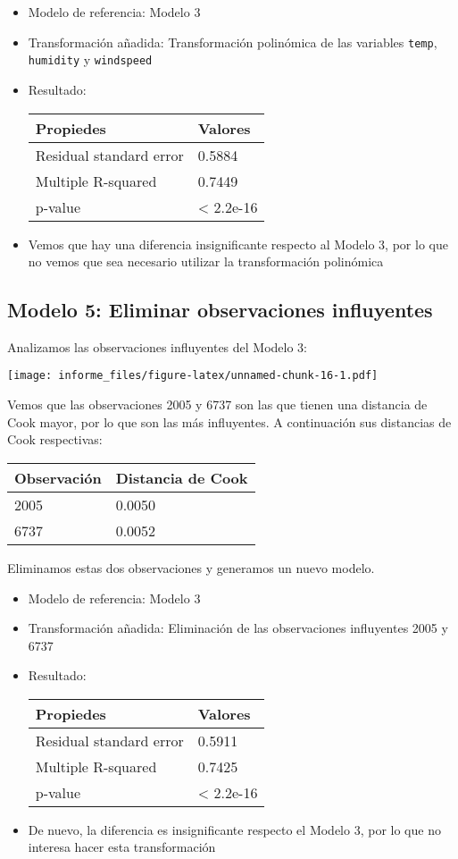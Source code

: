 \documentclass[
]{article}
\begin{document}
\begin{itemize}
\item
  Modelo de referencia: Modelo 3
\item
  Transformación añadida: Transformación polinómica de las variables
  \texttt{temp}, \texttt{humidity} y \texttt{windspeed}
\item
  Resultado:

  \begin{longtable}[]{@{}ll@{}}
  \toprule
  Propiedes & Valores\tabularnewline
  \midrule
  \endhead
  Residual standard error & 0.5884\tabularnewline
  Multiple R-squared & 0.7449\tabularnewline
  p-value & \textless{} 2.2e-16\tabularnewline
  \bottomrule
  \end{longtable}
\item
  Vemos que hay una diferencia insignificante respecto al Modelo 3, por
  lo que no vemos que sea necesario utilizar la transformación
  polinómica
\end{itemize}

\hypertarget{modelo-5-eliminar-observaciones-influyentes}{%
\subsection{Modelo 5: Eliminar observaciones
influyentes}\label{modelo-5-eliminar-observaciones-influyentes}}

Analizamos las observaciones influyentes del Modelo 3:

\texttt{[image: informe\_files/figure-latex/unnamed-chunk-16-1.pdf]}

Vemos que las observaciones 2005 y 6737 son las que tienen una distancia
de Cook mayor, por lo que son las más influyentes. A continuación sus
distancias de Cook respectivas:

\begin{longtable}[]{@{}ll@{}}
\toprule
Observación & Distancia de Cook\tabularnewline
\midrule
\endhead
2005 & 0.0050\tabularnewline
6737 & 0.0052\tabularnewline
\bottomrule
\end{longtable}

Eliminamos estas dos observaciones y generamos un nuevo modelo.

\begin{itemize}
\item
  Modelo de referencia: Modelo 3
\item
  Transformación añadida: Eliminación de las observaciones influyentes
  2005 y 6737
\item
  Resultado:

  \begin{longtable}[]{@{}ll@{}}
  \toprule
  Propiedes & Valores\tabularnewline
  \midrule
  \endhead
  Residual standard error & 0.5911\tabularnewline
  Multiple R-squared & 0.7425\tabularnewline
  p-value & \textless{} 2.2e-16\tabularnewline
  \bottomrule
  \end{longtable}
\item
  De nuevo, la diferencia es insignificante respecto el Modelo 3, por lo
  que no interesa hacer esta transformación
\end{itemize}
\end{document}
